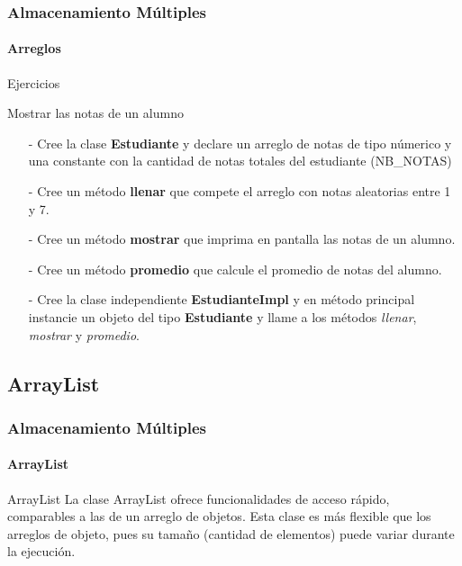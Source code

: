 \documentclass{beamer}
\begin{document}
		\begin{frame}
			\frametitle{Almacenamiento M\'ultiples}
			\framesubtitle{Arreglos}

			\begin{exampleblock}{Ejercicios}
			    {\scriptsize
                    Mostrar las notas de un alumno
				    \begin{itemize}
                        \item[-] Cree la clase \textbf{Estudiante} y declare un arreglo de notas de tipo n\'umerico y una constante con la cantidad de notas totales del estudiante (NB\_NOTAS)
                        \item[-] Cree un m\'etodo \textbf{llenar} que compete el arreglo con notas aleatorias entre 1 y 7.
                        \item[-] Cree un m\'etodo \textbf{mostrar} que imprima en pantalla las notas de un alumno.
                        \item[-] Cree un m\'etodo \textbf{promedio} que calcule el promedio de notas del alumno.
                        \item[-] Cree la clase independiente \textbf{EstudianteImpl} y en m\'etodo principal instancie un objeto del tipo \textbf{Estudiante} y llame a los m\'etodos \emph{llenar}, \emph{mostrar} y \emph{promedio}.
                    \end{itemize}
			    }
			\end{exampleblock}
		\end{frame}

        \subsection{ArrayList}

        \begin{frame}
			\frametitle{Almacenamiento M\'ultiples}
			\framesubtitle{ArrayList}

			\begin{block}{ArrayList}
			    {\scriptsize
				    La clase ArrayList ofrece funcionalidades de acceso r\'apido, comparables a las de un arreglo de objetos. Esta clase es m\'as flexible que los arreglos de objeto, pues su tama\~no (cantidad de elementos) puede variar durante la ejecuci\'on. 
			    }
			\end{block}
		\end{frame}
\end{document}
